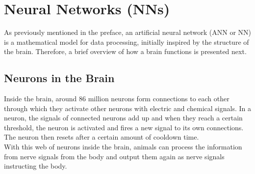 \section{Neural Networks (NNs)}\label{sec:neural-networks-(nns)}

As previously mentioned in the preface, an artificial neural network (ANN or NN) is a mathematical model for data processing, initially inspired by the structure of the brain.
Therefore, a brief overview of how a brain functions is presented next.

\subsection{Neurons in the Brain}\label{subsec:neurons-in-the-brain}
Inside the brain, around 86 million neurons\cite{caruso_23} form connections to each other through which they activate other neurons with electric and chemical signals.
In a neuron, the signals of connected neurons add up and when they reach a certain threshold, the neuron is activated and fires a new signal to its own connections.\cite{Newman_23}
The neuron then resets after a certain amount of cooldown time.
\\
With this web of neurons inside the brain, animals can process the information from nerve signals from the body and output them again as nerve signals instructing the body.


